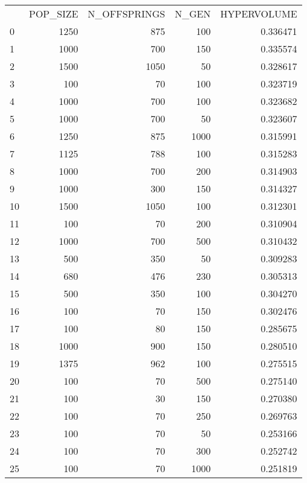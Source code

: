 \begin{tabular}{lrrrr}
 & POP_SIZE & N_OFFSPRINGS & N_GEN & HYPERVOLUME \\
0 & 1250 & 875 & 100 & 0.336471 \\
1 & 1000 & 700 & 150 & 0.335574 \\
2 & 1500 & 1050 & 50 & 0.328617 \\
3 & 100 & 70 & 100 & 0.323719 \\
4 & 1000 & 700 & 100 & 0.323682 \\
5 & 1000 & 700 & 50 & 0.323607 \\
6 & 1250 & 875 & 1000 & 0.315991 \\
7 & 1125 & 788 & 100 & 0.315283 \\
8 & 1000 & 700 & 200 & 0.314903 \\
9 & 1000 & 300 & 150 & 0.314327 \\
10 & 1500 & 1050 & 100 & 0.312301 \\
11 & 100 & 70 & 200 & 0.310904 \\
12 & 1000 & 700 & 500 & 0.310432 \\
13 & 500 & 350 & 50 & 0.309283 \\
14 & 680 & 476 & 230 & 0.305313 \\
15 & 500 & 350 & 100 & 0.304270 \\
16 & 100 & 70 & 150 & 0.302476 \\
17 & 100 & 80 & 150 & 0.285675 \\
18 & 1000 & 900 & 150 & 0.280510 \\
19 & 1375 & 962 & 100 & 0.275515 \\
20 & 100 & 70 & 500 & 0.275140 \\
21 & 100 & 30 & 150 & 0.270380 \\
22 & 100 & 70 & 250 & 0.269763 \\
23 & 100 & 70 & 50 & 0.253166 \\
24 & 100 & 70 & 300 & 0.252742 \\
25 & 100 & 70 & 1000 & 0.251819 \\
\end{tabular}
